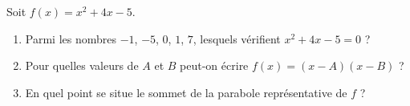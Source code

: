 
\begin{exercice}\label{exoPremiere-0095}

    Soit \( f(x)=x^2+4x-5\).
    \begin{multicols}{2}
        \begin{enumerate}
            \item
                Parmi les nombres \( -1\), \( -5\), \( 0\), \( 1\), \( 7\), lesquels vérifient \( x^2+4x-5=0\) ?
            \item
                Pour quelles valeurs de \( A\) et \( B\) peut-on écrire \( f(x)=(x-A)(x-B)\) ?
            \item
                En quel point se situe le sommet de la parabole représentative de $f$ ?
        \end{enumerate}
    \end{multicols}

\end{exercice}
